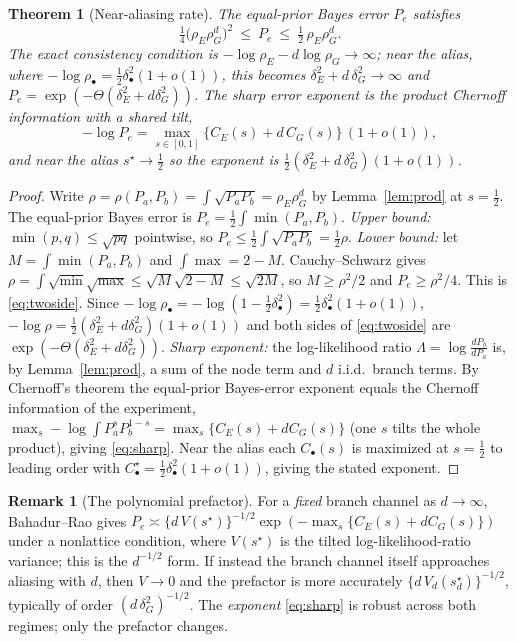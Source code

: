 \documentclass[11pt]{article}
\theoremstyle{plain}
\newtheorem{theorem}{Theorem}\newtheorem{proposition}{Proposition}\newtheorem{corollary}{Corollary}
\theoremstyle{definition}\newtheorem{assumption}{Assumption}\newtheorem{remark}{Remark}
\begin{document}
\begin{theorem}[Near-aliasing rate]\label{thm:rate}
The equal-prior Bayes error $P_e$ satisfies
\begin{equation}\label{eq:twoside}
   \tfrac14\big(\rho_E\rho_G^{d}\big)^2\ \le\ P_e\ \le\ \tfrac12\,\rho_E\rho_G^{d}.
\end{equation}
The \emph{exact} consistency condition is $-\log\rho_E-d\log\rho_G\to\infty$; \emph{near the alias}, where
$-\log\rho_\bullet=\tfrac12\delta_\bullet^2(1+o(1))$, this becomes $\delta_E^2+d\,\delta_G^2\to\infty$ and
$P_e=\exp(-\Theta(\delta_E^2+d\delta_G^2))$. The sharp error exponent is the product Chernoff information with a
\emph{shared} tilt,
\begin{equation}\label{eq:sharp}
   -\log P_e = \max_{s\in[0,1]}\{C_E(s)+d\,C_G(s)\}\,(1+o(1)),
\end{equation}
and near the alias $s^\star\to\tfrac12$ so the exponent is $\tfrac12(\delta_E^2+d\,\delta_G^2)(1+o(1))$.
\end{theorem}
\begin{proof}
Write $\rho=\rho(P_a,P_b)=\int\sqrt{P_aP_b}=\rho_E\rho_G^{d}$ by Lemma~\ref{lem:prod} at $s=\tfrac12$. The
equal-prior Bayes error is $P_e=\tfrac12\int\min(P_a,P_b)$.
\emph{Upper bound:} $\min(p,q)\le\sqrt{pq}$ pointwise, so $P_e\le\tfrac12\int\sqrt{P_aP_b}=\tfrac12\rho$.
\emph{Lower bound:} let $M=\int\min(P_a,P_b)$ and $\int\max=2-M$. Cauchy--Schwarz gives
$\rho=\int\sqrt{\min}\sqrt{\max}\le\sqrt{M}\sqrt{2-M}\le\sqrt{2M}$, so $M\ge\rho^2/2$ and $P_e\ge\rho^2/4$. This is
\eqref{eq:twoside}. Since $-\log\rho_\bullet=-\log(1-\tfrac12\delta_\bullet^2)=\tfrac12\delta_\bullet^2(1+o(1))$,
$-\log\rho=\tfrac12(\delta_E^2+d\delta_G^2)(1+o(1))$ and both sides of \eqref{eq:twoside} are
$\exp(-\Theta(\delta_E^2+d\delta_G^2))$.
\emph{Sharp exponent:} the log-likelihood ratio $\Lambda=\log\frac{dP_b}{dP_a}$ is, by Lemma~\ref{lem:prod}, a sum
of the node term and $d$ i.i.d.\ branch terms. By Chernoff's theorem the equal-prior Bayes-error exponent equals
the Chernoff information of the experiment, $\max_s-\log\int P_a^sP_b^{1-s}=\max_s\{C_E(s)+dC_G(s)\}$ (one $s$
tilts the whole product), giving \eqref{eq:sharp}. Near the alias each $C_\bullet(s)$ is maximized at $s=\tfrac12$
to leading order with $C_\bullet^\star=\tfrac12\delta_\bullet^2(1+o(1))$, giving the stated exponent.
\end{proof}
\begin{remark}[The polynomial prefactor]
For a \emph{fixed} branch channel as $d\to\infty$, Bahadur--Rao gives $P_e\asymp\{d\,V(s^\star)\}^{-1/2}
\exp(-\max_s\{C_E(s)+dC_G(s)\})$ under a nonlattice condition, where $V(s^\star)$ is the tilted log-likelihood-ratio
variance; this is the $d^{-1/2}$ form. If instead the branch channel itself approaches aliasing with $d$, then
$V\to0$ and the prefactor is more accurately $\{d\,V_d(s_d^\star)\}^{-1/2}$, typically of order
$(d\,\delta_G^2)^{-1/2}$. The \emph{exponent} \eqref{eq:sharp} is robust across both regimes; only the prefactor
changes.
\end{remark}
\end{document}
